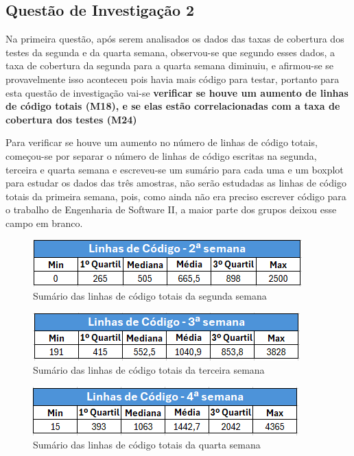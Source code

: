 \subsection{Questão de Investigação 2}
Na primeira questão, após serem analisados os dados das taxas de cobertura dos testes da segunda e da quarta semana, observou-se que segundo esses dados, a taxa de cobertura da segunda para a quarta semana diminuiu, e afirmou-se se provavelmente isso aconteceu pois havia mais código para testar, portanto para esta questão de investigação vai-se \textbf{verificar se houve um aumento de linhas de código totais (M18), e se elas estão correlacionadas com a taxa de cobertura dos testes (M24)}

Para verificar se houve um aumento no número de linhas de código totais, começou-se por separar o número de linhas de código escritas na segunda, terceira e quarta semana e escreveu-se um sumário para cada uma e um boxplot para estudar os dados das três amostras, não serão estudadas as linhas de código totais da primeira semana, pois, como ainda não era preciso escrever código para o trabalho de Engenharia de Software II, a maior parte dos grupos deixou esse campo em branco.

\begin{figure}
    \centering
    \label{fig:sumarryLinhasSemana2}
    \includegraphics[width=0.5\linewidth]{imagens//questao2/sumarryLinhasSemana2.png}
    \caption{Sumário das linhas de código totais da segunda semana}
    \label{fig:sumarryLinhasSemana2}
\end{figure}

\begin{figure}
    \centering
    \label{fig:sumarryLinhasSemana3}
    \includegraphics[width=0.5\linewidth]{imagens//questao2/sumarryLinhasSemana3.png}
    \caption{Sumário das linhas de código totais da terceira semana}
    \label{fig:sumarryLinhasSemana3}
\end{figure}

\begin{figure}
    \centering
    \label{fig:sumarryLinhasSemana4}
    \includegraphics[width=0.5\linewidth]{imagens//questao2/sumarryLinhasSemana4.png}
    \caption{Sumário das linhas de código totais da quarta semana}
\end{figure}

